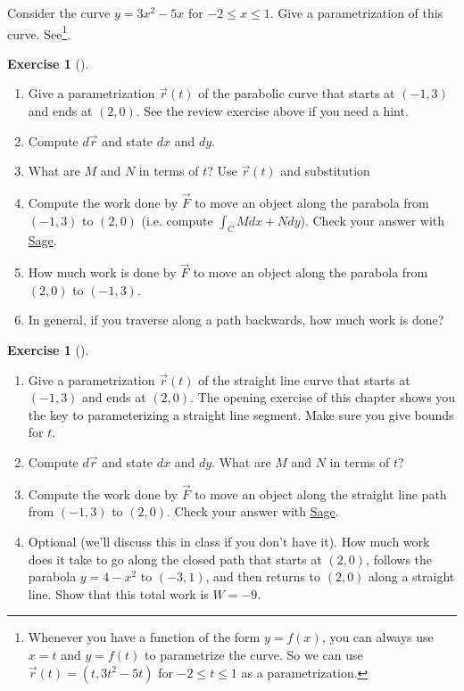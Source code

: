 \documentclass[10pt,]{book}
\theoremstyle{plain}
\theoremstyle{definition}
\theoremstyle{definition}
\theoremstyle{definition}
\theoremstyle{definition}
\newtheorem{exploration}[project]{Exercise}
\theoremstyle{definition}
\numberwithin{equation}{section}
\newcommand{\sageworkurl}{http://bmw.byuimath.com/dokuwiki/doku.php?id=work_calculator}
\begin{document}
Consider the curve \(y=3x^2-5x\) for \(-2\leq x\leq 1\). Give a parametrization of this curve. See\footnote{Whenever you have a function of the form \(y=f(x)\), you can always use \(x=t\) and \(y=f(t)\) to parametrize the curve.  So we can use \(\vec r(t) = (t, 3t^2-5t)\) for \(-2\leq t\leq 1\) as a parametrization.\label{fn-18}}.%
\begin{exploration}[]\label{exploration-191}
\leavevmode%
\begin{enumerate}[font=\bfseries,label=(\alph*),ref=\alph*]
\item\label{task-474} Give a parametrization \(\vec r(t)\) of the parabolic curve that starts at \((-1,3)\) and ends at \((2,0)\).  See the review exercise above if you need a hint.%
\item\label{task-475} Compute \(d\vec r\) and state \(dx\) and \(dy\).%
\item\label{task-476} What are \(M\) and \(N\) in terms of \(t\)? Use \(\vec r (t)\) and substitution%
%
\item\label{task-477} Compute the work done by \(\vec F\) to move an object along the parabola from \((-1,3)\) to \((2,0)\) (i.e. compute \(\int _C Mdx+Ndy\)). Check your answer with \href{\\sageworkurl}{Sage}.%
\item\label{task-478} How much work is done by \(\vec F\) to move an object along the parabola from \((2,0)\) to \((-1,3)\).%
\item\label{task-479} In general, if you traverse along a path backwards, how much work is done?%
\end{enumerate}
\end{exploration}
\begin{exploration}[]\label{exploration-192}
\leavevmode%
\begin{enumerate}[font=\bfseries,label=(\alph*),ref=\alph*]
\item\label{task-480} Give a parametrization \(\vec r(t)\) of the straight line curve that starts at \((-1,3)\) and ends at \((2,0)\). The opening exercise of this chapter shows you the key to parameterizing a straight line segment.  Make sure you give bounds for \(t\).%
\item\label{task-481} Compute \(d\vec r\) and state \(dx\) and \(dy\). What are \(M\) and \(N\) in terms of \(t\)?%
\item\label{task-482} Compute the work done by \(\vec F\) to move an object along the straight line path from \((-1,3)\) to \((2,0)\). Check your answer with \href{\\sageworkurl}{Sage}.  %
\item\label{task-483} Optional (we'll discuss this in class if you don't have it).  How much work does it take to go along the closed path that starts at \((2,0)\), follows the parabola \(y=4-x^2\) to \((-3,1)\), and then returns to \((2,0)\) along a straight line. Show that this total work is \(W=-9\).%
\end{enumerate}
\end{exploration}
\end{document}
